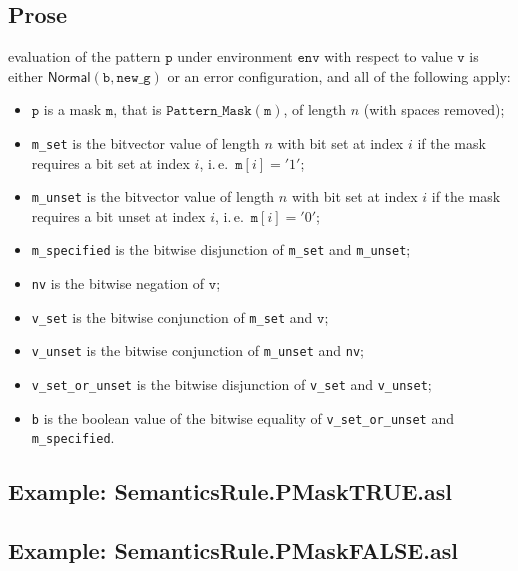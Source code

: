 \documentclass{book}
\newcommand\Normal[0]{\textsf{Normal}}
\newcommand\env[0]{\texttt{env}}
\newcommand\newg[0]{\texttt{new\_g}}
\newcommand\vm[0]{\texttt{m}}
\newcommand\vp[0]{\texttt{p}}
\newcommand\vv[0]{\texttt{v}}
\newcommand\vb[0]{\texttt{b}}
\begin{document}
    \subsection{Prose}
    evaluation of the pattern $\vp$ under environment $\env$ with
    respect to value $\vv$ is either $\Normal(\vb, \newg)$ or an error configuration,
    and all of the following apply:
    \begin{itemize}
      \item $\vp$ is a mask $\vm$, that is $\texttt{Pattern\_Mask}(\vm)$,
      of length $n$ (with spaces removed);
      \item \texttt{m\_set} is the bitvector value of length $n$ with bit set
        at index $i$ if the mask requires a bit set at index $i$, i.\,e.\
        $\texttt{m}[i] = '1'$;
      \item \texttt{m\_unset} is the bitvector value of length $n$ with bit set
        at index $i$ if the mask requires a bit unset at index $i$, i.\,e.\
        $\texttt{m}[i] = '0'$;
      \item \texttt{m\_specified} is the bitwise disjunction of \texttt{m\_set}
        and \texttt{m\_unset};
      \item \texttt{nv} is the bitwise negation of $\vv$;
      \item \texttt{v\_set} is the bitwise conjunction of \texttt{m\_set} and
        $\vv$;
      \item \texttt{v\_unset} is the bitwise conjunction of \texttt{m\_unset} and
        \texttt{nv};
      \item \texttt{v\_set\_or\_unset} is the bitwise disjunction of
        \texttt{v\_set} and \texttt{v\_unset};
      \item \texttt{b} is the boolean value of the bitwise equality of
        \texttt{v\_set\_or\_unset} and \texttt{m\_specified}.
    \end{itemize}

    \subsection{Example: SemanticsRule.PMaskTRUE.asl}

    \subsection{Example: SemanticsRule.PMaskFALSE.asl}
\end{document}
